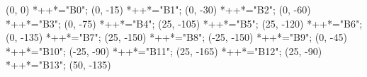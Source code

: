 \begin{scriptsize}
\xy(0, 0)
	*++{}*\frm{-,}="B0";
(0, -15)
	*++{}*\frm{-,}="B1";
(0, -30)
	*++{}*\frm{-,}="B2";
(0, -60)
	*++{}*\frm{-,}="B3";
(0, -75)
	 *++{}*\frm{-,}="B4";
(25, -105)
	*++{}*\frm{-,}="B5";
(25, -120)
	 *++{}*\frm{-,}="B6";
(0, -135)
	*++{}*\frm{-,}="B7";
(25, -150)
	 *++{}*\frm{-,}="B8";
(-25, -150)
	 *++{}*\frm{-,}="B9";
(0, -45)
	*++{}*\frm{-,}="B10";
(-25, -90)
	*++{}*\frm{-,}="B11";
(25, -165)
	*++{}*\frm{-,}="B12";
(25, -90)
	*++{}*\frm{-,}="B13";
(50, -135)

\end{scriptsize}
